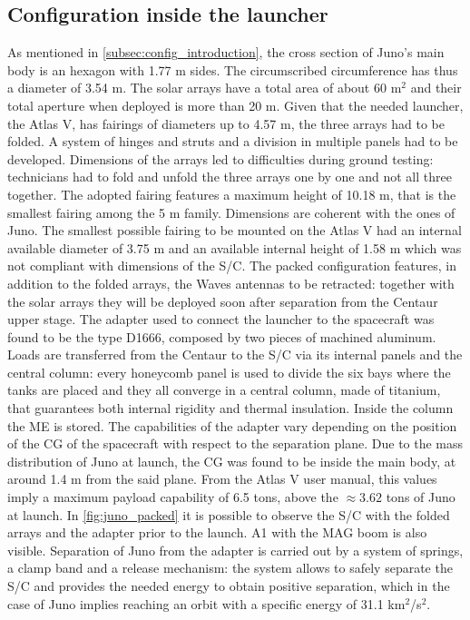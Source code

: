 \subsection{Configuration inside the launcher}
\label{subsec:config_launcher}

As mentioned in \autoref{subsec:config_introduction}, the cross section of Juno's main body is an hexagon with 1.77 m sides.
The circumscribed circumference has thus a diameter of 3.54 m. The solar arrays have a total area of about 60 m$^2$ and their total aperture when deployed is more than 20 m.\cite{masses_ref}
Given that the needed launcher, the Atlas V, has fairings of diameters up to 4.57 m, the three arrays had to be folded.
A system of hinges and struts and a division in multiple panels had to be developed.\cite{solar_panels_coef}
Dimensions of the arrays led to difficulties during ground testing: technicians had to fold and unfold the three arrays one by one and not all three together.\cite{solar_panels_testing}
The adopted fairing features a maximum height of 10.18 m, that is the smallest fairing among the 5 m family.\cite{atlas_manual}
Dimensions are coherent with the ones of Juno.
The smallest possible fairing to be mounted on the Atlas V had an internal available diameter of 3.75 m and an available internal height of 1.58 m which was not compliant with dimensions of the S/C.
The packed configuration features, in addition to the folded arrays, the Waves antennas to be retracted: together with the solar arrays they will be deployed soon after separation from the Centaur upper stage.
The adapter used to connect the launcher to the spacecraft was found to be the type D1666, composed by two pieces of machined aluminum.
Loads are transferred from the Centaur to the S/C via its internal panels and the central column: every honeycomb panel is used to divide the six bays where the tanks are placed and they all converge in a central column, made of titanium, that guarantees both internal rigidity and thermal insulation.
Inside the column the ME is stored. The capabilities of the adapter vary depending on the position of the CG of the spacecraft with respect to the separation plane.\cite{atlas_manual}
Due to the mass distribution of Juno at launch, the CG was found to be inside the main body, at around 1.4 m from the said plane.
From the Atlas V user manual\cite{atlas_manual}, this values imply a maximum payload capability of 6.5 tons, above the $\approx 3.62$ tons of Juno at launch.\cite{masses_ref}
In \autoref{fig:juno_packed}\cite{foto_fairing} it is possible to observe the S/C with the folded arrays and the adapter prior to the launch. A1 with the MAG boom is also visible.
Separation of Juno from the adapter is carried out by a system of springs, a clamp band and a release mechanism: the system allows to safely separate the S/C and provides the needed energy to obtain positive separation, which in the case of Juno implies reaching an orbit with a specific energy of 31.1 km$^2$/s$^2$.